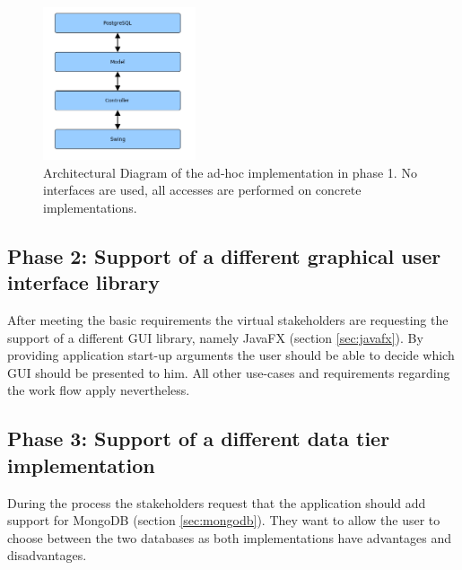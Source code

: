 \begin{figure}[htbp]
		\centering
	\includegraphics[width=0.4\textwidth]{./content/pictures/monoV1.jpg}
	\caption[Architectual Diagram of the ad-hoc implementation in phase 1.]{Architectural Diagram of the ad-hoc implementation in phase 1. No interfaces are used, all accesses are performed on concrete implementations.}
	\label{fig:monoV1}
\end{figure}



\subsection{Phase 2: Support of a different graphical user interface library}
After meeting the basic requirements the virtual stakeholders are requesting the support of a different GUI library, namely JavaFX (section \ref{sec:javafx}). By providing application start-up arguments the user should be able to decide which GUI should be presented to him. All other use-cases and requirements regarding the work flow apply nevertheless.

\subsection{Phase 3: Support of a different data tier implementation}
During the process the stakeholders request that the application should add support for MongoDB (section \ref{sec:mongodb}). They want to allow the user to choose between the two databases as both implementations have advantages and disadvantages. 

